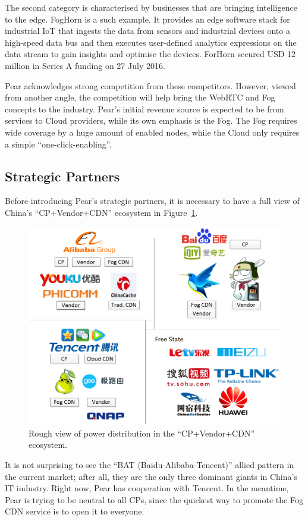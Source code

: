The second category is characterised by businesses that are bringing intelligence to the edge. FogHorn is a such example. It provides an edge software stack for industrial IoT that ingests the data from sensors and industrial devices onto a high-speed data bus and then executes user-defined analytics expressions on the data stream to gain insights and optimise the devices. ForHorn secured USD 12 million in Series A funding on 27 July 2016. 

Pear acknowledges strong competition from these competitors. However, viewed from another angle, the competition will help bring the WebRTC and Fog concepts to the industry. Pear's initial revenue source is expected to be from services to Cloud providers, while its own emphasis is the Fog. The Fog requires wide coverage by a huge amount of enabled nodes, while the Cloud only requires a simple ``one-click-enabling''. 

\subsection{Strategic Partners}
Before introducing Pear's strategic partners, it is necessary to have a full view of China's “CP+Vendor+CDN” ecosystem in Figure~\ref{fig:cp-vendor-cdn}.
\begin{figure}[ht]
	\centering
	\includegraphics[width=.75\textwidth]{fig/biz/cp-vendor-cdn.png}
	\caption{Rough view of power distribution in the ``CP+Vendor+CDN'' ecosystem.} \label{fig:cp-vendor-cdn}
\end{figure}

It is not surprising to see the ``BAT (Baidu-Alibaba-Tencent)'' allied pattern in the current market; after all, they are the only three dominant giants in China's IT industry. Right now, Pear has cooperation with Tencent. In the meantime, Pear is trying to be neutral to all CPs, since the quickest way to promote the Fog CDN service is to open it to everyone.

